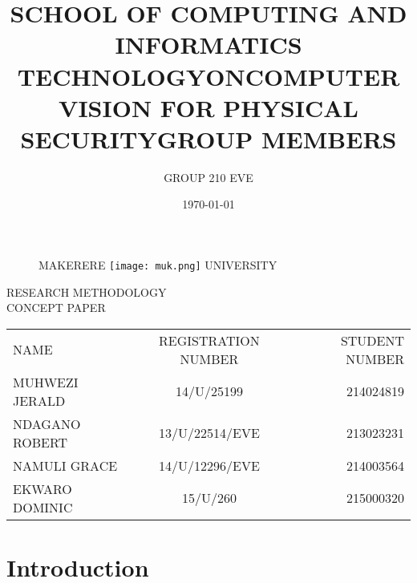 \documentclass[11pt]{article}
\begin{document}
		
\title{SCHOOL OF COMPUTING AND INFORMATICS\\ TECHNOLOGY}
\author{GROUP 210 EVE}
\date{\today{}}
\begin{figure}
	\begin{center}
	\Huge MAKERERE \texttt{[image: muk.png]} \Huge UNIVERSITY
	\end{center}
\end{figure}
	\maketitle
	
	\begin{center}
	RESEARCH METHODOLOGY \\CONCEPT PAPER
	\end{center}
\begin{center}
	\title{ON}
\end{center}
	\begin{center}
		\title{COMPUTER VISION FOR PHYSICAL SECURITY}
	\end{center}
    \begin{center}
    	\title{GROUP MEMBERS}
    	\begin{table}[!th]
    		\begin{tabular}{|l|c|r|}
    			\hline
    			NAME & REGISTRATION NUMBER & STUDENT NUMBER \\
    			MUHWEZI JERALD & 14/U/25199 & 214024819 \\
    			NDAGANO ROBERT & 13/U/22514/EVE & 213023231 \\
    			NAMULI GRACE & 14/U/12296/EVE & 214003564 \\
    			EKWARO DOMINIC & 15/U/260 & 215000320 \\
    			\hline
    		\end{tabular}
    	\end{table}
    \end{center}
	\newpage
	\section{ \textbf{Introduction} }
\end{document}

